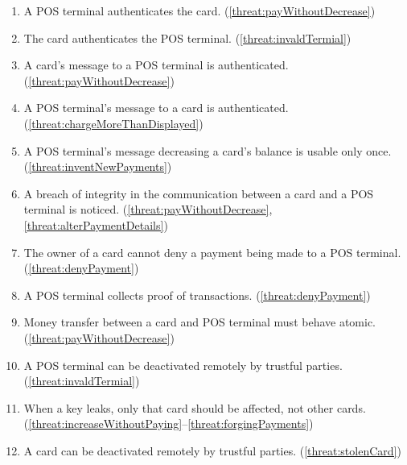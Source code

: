 \begin{enumerate}[label={SR\arabic*:}, leftmargin=3\parindent]
    \item \label{sr:POSAuthCard}
    A POS terminal authenticates the card. (\ref{threat:payWithoutDecrease})
    \item \label{sr:cardAuthPOS}
    The card authenticates the POS terminal. (\ref{threat:invaldTermial})
    \item \label{sr:POScardMessageAuth}
    A card's message to a POS terminal is authenticated. (\ref{threat:payWithoutDecrease})
    \item \label{sr:cardPOSMessageAuth}
    A POS terminal's message to a card is authenticated. (\ref{threat:chargeMoreThanDisplayed})
    \item \label{sr:noReplayDecreasingCard}
    A POS terminal's message decreasing a card's balance is usable only once. (\ref{threat:inventNewPayments})
    \item \label{sr:cardPOSMessageIntegrity}
    A breach of integrity in the communication between a card and a POS terminal is noticed. (\ref{threat:payWithoutDecrease}, \ref{threat:alterPaymentDetails})
    \item \label{sr:cardNonRepudiation}
    The owner of a card cannot deny a payment being made to a POS terminal. (\ref{threat:denyPayment})
    \item \label{sr:proofTransaction}
    A POS terminal collects proof of transactions. (\ref{threat:denyPayment})
    \item \label{sr:cardPOStransterAtomic}
    Money transfer between a card and POS terminal must behave atomic. (\ref{threat:payWithoutDecrease})
    \item \label{sr:disablePOS}
    A POS terminal can be deactivated remotely by trustful parties. (\ref{threat:invaldTermial})

    \item \label{sr:keyLeakage}
    When a key leaks, only that card should be affected, not other cards. (\ref{threat:increaseWithoutPaying}--\ref{threat:forgingPayments})
    \item \label{sr:disableCard}
    A card can be deactivated remotely by trustful parties. (\ref{threat:stolenCard})
\end{enumerate}

